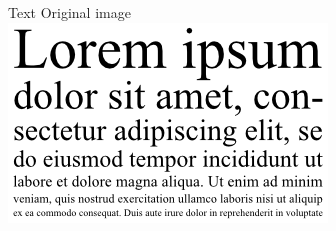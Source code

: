 \documentclass[10pt]{beamer}
\begin{document}
\begin{frame}{Text}
\centering
Original image
\\
\includegraphics[height=37ex]{results/lorem} 
\end{frame}
\end{document}
